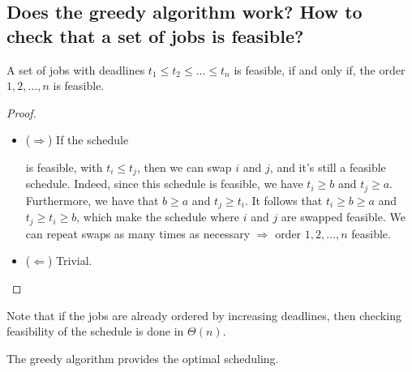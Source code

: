 \subsection{Does the greedy algorithm work? How to check that a set of jobs is feasible?}
\begin{theorem}
A set of jobs with deadlines $ t_1 \leq t_2  \leq \hdots \leq t_n $ is feasible, if and only if, the order $1, 2, \ldots, n$ is feasible.
\end{theorem}
\begin{proof} ~

\begin{itemize}
\item ($\Rightarrow$) If the schedule

\begin{figure}[h!]
\centering


\end{figure}
is feasible, with $t_i \leq t_j$, then we can swap $i$ and $j$, and it’s still a feasible schedule. Indeed, since this schedule is feasible, we have $t_i  \geq b$ and $t_j \geq a$. Furthermore, we have that $b \geq a$ and $t_j \geq t_i$. It follows that $t_i \geq b \geq a$ and $t_j \geq t_i \geq b$, which make the schedule where $i$ and $j$ are swapped feasible. We can repeat swaps as many times as necessary $ \Rightarrow$ order $1,2,\hdots, n$ feasible.

\item ($\Leftarrow$) Trivial.
\end{itemize}

\end{proof}

Note that if the jobs are already ordered by increasing deadlines, then checking feasibility of the schedule is done in $\Theta(n)$.

\begin{theorem}
The greedy algorithm provides the optimal scheduling.
\end{theorem}

